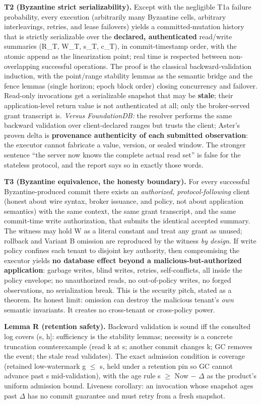 \documentclass[
  11pt,
]{article}
\begin{document}
\textbf{T2 (Byzantine strict serializability).} Except with the negligible T1a failure probability, every execution (arbitrarily many Byzantine cells, arbitrary interleavings, retries, and lease failovers) yields a committed-mutation history that is strictly serializable over the \textbf{declared, authenticated} read/write summaries (R\_T, W\_T, s\_T, c\_T), in commit-timestamp order, with the atomic append as the linearization point; real time is respected between non-overlapping successful operations. The proof is the classical backward-validation induction, with the point/range stability lemmas as the semantic bridge and the fence lemmas (single horizon; epoch block order) closing concurrency and failover. Read-only invocations get a serializable snapshot that may be \textbf{stale}; their application-level return value is not authenticated at all; only the broker-served grant transcript is. \emph{Versus FoundationDB:} the resolver performs the same backward validation over client-declared ranges but trusts the client; Aster's proven delta is \textbf{provenance authenticity of each submitted observation}: the executor cannot fabricate a value, version, or sealed window. The stronger sentence ``the server now knows the complete actual read set'' is false for the stateless protocol, and the report says so in exactly those words.

\textbf{T3 (Byzantine equivalence, the honesty boundary).} For every successful Byzantine-produced commit there exists an \emph{authorized, protocol-following} client (honest about wire syntax, broker issuance, and policy, not about application semantics) with the same context, the same grant transcript, and the same commit-time write authorization, that submits the identical accepted summary. The witness may hold W as a literal constant and treat any grant as unused; rollback and Variant B omission are reproduced by the witness \emph{by design}. If write policy confines each tenant to disjoint key authority, then compromising the executor yields \textbf{no database effect beyond a malicious-but-authorized application}: garbage writes, blind writes, retries, self-conflicts, all inside the policy envelope; no unauthorized reads, no out-of-policy writes, no forged observations, no serialization break. This is the security pitch, stated as a theorem. Its honest limit: omission can destroy the malicious tenant's \emph{own} semantic invariants. It creates no cross-tenant or cross-policy power.

\textbf{Lemma R (retention safety).} Backward validation is sound iff the consulted log covers (s, h{]}: sufficiency is the stability lemmas; necessity is a concrete truncation counterexample (read k at s; another commit changes k; GC removes the event; the stale read validates). The exact admission condition is coverage (retained low-watermark g $\le$ s, held under a retention pin so GC cannot advance past s mid-validation), with the age rule s $\ge$ Now $-$ $\Delta$ as the product's uniform admission bound. Liveness corollary: an invocation whose snapshot ages past $\Delta$ has no commit guarantee and must retry from a fresh snapshot.
\end{document}
